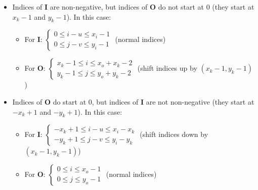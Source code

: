 \documentclass[12pt]{article}
\begin{document}
\begin{itemize}
    \begin{itemize}
        \item Indices of $\bm{I}$ are non-negative, but indices of $\bm{O}$ do not start at 0 (they start at $x_k - 1$ and $y_k - 1$). In this case:
        \begin{itemize}
            \item For $\bm{I}$: 
            $\begin{cases}
            0 \leq i - u \leq x_i - 1\\
            0 \leq j - v \leq y_i - 1
            \end{cases}$
            (normal indices)
            
            \item For $\bm{O}$:
            $\begin{cases}
            x_k - 1 \leq i \leq x_o + x_k - 2\\
            y_k - 1\leq j \leq y_o + y_k - 2
            \end{cases}$
            (shift indices up by $(x_k - 1, y_k - 1)$)
        \end{itemize}
        \item Indices of $\bm{O}$ do start at 0, but indices of $\bm{I}$ are not non-negative (they start at $- x_k + 1$ and $-y_k + 1$). In this case:
        \begin{itemize}
            \item For $\bm{I}$: 
            $\begin{cases}
            -x_k + 1 \leq i - u \leq x_i - x_k\\
            -y_k + 1\leq j - v \leq y_i - y_k
            \end{cases}$
            (shift indices down by $(x_k - 1, y_k - 1)$)
            
            \item For $\bm{O}$:
            $\begin{cases}
            0 \leq i \leq x_o - 1\\
            0 \leq j \leq y_o - 1
            \end{cases}$
            (normal indices)
        \end{itemize}
    \end{itemize}
    

\end{itemize}
\end{document}
